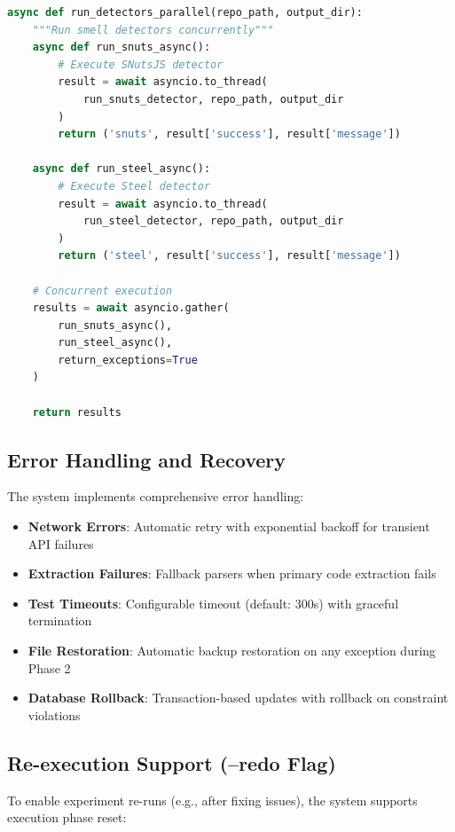 \begin{lstlisting}[language=Python, caption=Async Smell Detection]
async def run_detectors_parallel(repo_path, output_dir):
    """Run smell detectors concurrently"""
    async def run_snuts_async():
        # Execute SNutsJS detector
        result = await asyncio.to_thread(
            run_snuts_detector, repo_path, output_dir
        )
        return ('snuts', result['success'], result['message'])
    
    async def run_steel_async():
        # Execute Steel detector
        result = await asyncio.to_thread(
            run_steel_detector, repo_path, output_dir
        )
        return ('steel', result['success'], result['message'])
    
    # Concurrent execution
    results = await asyncio.gather(
        run_snuts_async(),
        run_steel_async(),
        return_exceptions=True
    )
    
    return results
\end{lstlisting}

\subsection{Error Handling and Recovery}

The system implements comprehensive error handling:

\begin{itemize}
    \item \textbf{Network Errors}: Automatic retry with exponential backoff for transient API failures
    \item \textbf{Extraction Failures}: Fallback parsers when primary code extraction fails
    \item \textbf{Test Timeouts}: Configurable timeout (default: 300s) with graceful termination
    \item \textbf{File Restoration}: Automatic backup restoration on any exception during Phase 2
    \item \textbf{Database Rollback}: Transaction-based updates with rollback on constraint violations
\end{itemize}

\subsection{Re-execution Support (--redo Flag)}

To enable experiment re-runs (e.g., after fixing issues), the system supports execution phase reset:


